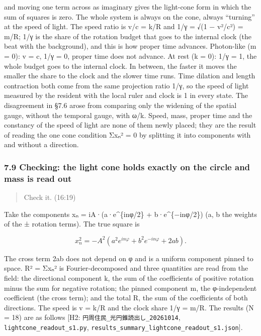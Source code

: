 \documentclass[
  a4paper,
]{article}
\newcounter{none} %
\begin{document}
and moving one term across as imaginary gives the light-cone form in
which the sum of squares is zero. The whole system is always on the
cone, always ``turning'' at the speed of light. The speed ratio is v/c =
k/R and 1/γ = √(1 − v²/c²) = m/R; 1/γ is the share of the rotation
budget that goes to the internal clock (the beat with the background),
and this is how proper time advances. Photon-like (m = 0): v = c, 1/γ =
0, proper time does not advance. At rest (k = 0): 1/γ = 1, the whole
budget goes to the internal clock. In between, the faster it moves the
smaller the share to the clock and the slower time runs. Time dilation
and length contraction both come from the same projection ratio 1/γ, so
the speed of light measured by the resident with the local ruler and
clock is 1 in every state. The disagreement in §7.6 arose from comparing
only the widening of the spatial gauge, without the temporal gauge, with
ω/k. Speed, mass, proper time and the constancy of the speed of light
are none of them newly placed; they are the result of reading the one
cone condition Σxₙ² = 0 by splitting it into components with and without
a direction.

\subsubsection{7.9 Checking: the light cone holds exactly on the circle
and mass is read
out}\label{checking-the-light-cone-holds-exactly-on-the-circle-and-mass-is-read-out}

\begin{quote}
Check it. (16:19)
\end{quote}

Take the components xₙ = iA·(a·e\^{}\{inφ/2\} + b·e\^{}\{−inφ/2\}) (a, b
the weights of the ± rotation terms). The true square is

\[
x_n^2=-A^2\left(a^2e^{in\varphi}+b^2e^{-in\varphi}+2ab\right).
\]

The cross term 2ab does not depend on φ and is a uniform component
pinned to space. R² = Σxₙ² is Fourier-decomposed and three quantities
are read from the field: the directional component k, the sum of the
coefficients of positive rotation minus the sum for negative rotation;
the pinned component m, the φ-independent coefficient (the cross term);
and the total R, the sum of the coefficients of both directions. The
speed is v = k/R and the clock share 1/γ = m/R. The results (N = 18) are
as follows {[}H2: \texttt{円周住民\_\allowbreak{}光円錐読出し\_\allowbreak{}20261014},
\texttt{lightcone\_\allowbreak{}readout\_\allowbreak{}s1.py},
\texttt{results\_\allowbreak{}summary\_\allowbreak{}lightcone\_\allowbreak{}readout\_\allowbreak{}s1.json}{]}.
\end{document}
